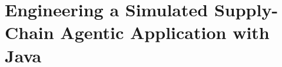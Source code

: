 \part{Engineering a Simulated Supply-Chain Agentic Application with Java}
\label{part:engineering}






